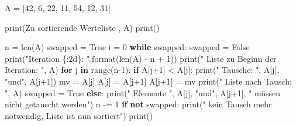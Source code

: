 \documentclass[
  letterpaper,
  DIV=11,
  numbers=noendperiod]{scrreprt}
\newenvironment{Shaded}{\begin{snugshade}}{\end{snugshade}}
\newcommand{\BuiltInTok}[1]{\textcolor[rgb]{0.00,0.23,0.31}{#1}}
\newcommand{\ControlFlowTok}[1]{\textcolor[rgb]{0.00,0.23,0.31}{\textbf{#1}}}
\newcommand{\DecValTok}[1]{\textcolor[rgb]{0.68,0.00,0.00}{#1}}
\newcommand{\KeywordTok}[1]{\textcolor[rgb]{0.00,0.23,0.31}{\textbf{#1}}}
\newcommand{\NormalTok}[1]{\textcolor[rgb]{0.00,0.23,0.31}{#1}}
\newcommand{\OperatorTok}[1]{\textcolor[rgb]{0.37,0.37,0.37}{#1}}
\newcommand{\SpecialCharTok}[1]{\textcolor[rgb]{0.37,0.37,0.37}{#1}}
\newcommand{\StringTok}[1]{\textcolor[rgb]{0.13,0.47,0.30}{#1}}
\newcommand{\VariableTok}[1]{\textcolor[rgb]{0.07,0.07,0.07}{#1}}
\begin{document}
\begin{Shaded}
\begin{Highlighting}[]
\NormalTok{A }\OperatorTok{=}\NormalTok{ [}\DecValTok{42}\NormalTok{, }\DecValTok{6}\NormalTok{, }\DecValTok{22}\NormalTok{, }\DecValTok{11}\NormalTok{, }\DecValTok{54}\NormalTok{, }\DecValTok{12}\NormalTok{, }\DecValTok{31}\NormalTok{]}

\BuiltInTok{print}\NormalTok{(}\StringTok{\textquotesingle{}Zu sortierende Werteliste \textquotesingle{}}\NormalTok{, A)}
\BuiltInTok{print}\NormalTok{()}

\NormalTok{n }\OperatorTok{=} \BuiltInTok{len}\NormalTok{(A)}
\NormalTok{swapped }\OperatorTok{=} \VariableTok{True}
\NormalTok{i }\OperatorTok{=} \DecValTok{0}
\ControlFlowTok{while}\NormalTok{ swapped:}
\NormalTok{    swapped }\OperatorTok{=} \VariableTok{False}
    \BuiltInTok{print}\NormalTok{(}\StringTok{"Iteration }\SpecialCharTok{\{:2d\}}\StringTok{: "}\NormalTok{.}\BuiltInTok{format}\NormalTok{(}\BuiltInTok{len}\NormalTok{(A) }\OperatorTok{{-}}\NormalTok{ n }\OperatorTok{+} \DecValTok{1}\NormalTok{))}
    \BuiltInTok{print}\NormalTok{(}\StringTok{"   Liste zu Beginn der Iteration: "}\NormalTok{, A)}
    \ControlFlowTok{for}\NormalTok{ j }\KeywordTok{in} \BuiltInTok{range}\NormalTok{(n}\OperatorTok{{-}}\DecValTok{1}\NormalTok{):}
        \ControlFlowTok{if}\NormalTok{ A[j}\OperatorTok{+}\DecValTok{1}\NormalTok{] }\OperatorTok{\textless{}}\NormalTok{ A[j]:}
            \BuiltInTok{print}\NormalTok{(}\StringTok{"   Tausche: "}\NormalTok{, A[j], }\StringTok{"und"}\NormalTok{, A[j}\OperatorTok{+}\DecValTok{1}\NormalTok{])}
\NormalTok{            mv }\OperatorTok{=}\NormalTok{ A[j]}
\NormalTok{            A[j] }\OperatorTok{=}\NormalTok{ A[j}\OperatorTok{+}\DecValTok{1}\NormalTok{]}
\NormalTok{            A[j}\OperatorTok{+}\DecValTok{1}\NormalTok{] }\OperatorTok{=}\NormalTok{ mv}
            \BuiltInTok{print}\NormalTok{(}\StringTok{"   Liste nach Tausch: "}\NormalTok{, A)}
\NormalTok{            swapped }\OperatorTok{=} \VariableTok{True}
        \ControlFlowTok{else}\NormalTok{:}
            \BuiltInTok{print}\NormalTok{(}\StringTok{"   Elemente "}\NormalTok{, A[j], }\StringTok{"und"}\NormalTok{, A[j}\OperatorTok{+}\DecValTok{1}\NormalTok{], }\StringTok{" müssen nicht getauscht werden"}\NormalTok{)}
\NormalTok{    n }\OperatorTok{{-}=} \DecValTok{1}
    \ControlFlowTok{if} \KeywordTok{not}\NormalTok{ swapped:}
        \BuiltInTok{print}\NormalTok{(}\StringTok{"   kein Tausch mehr notwendig, Liste ist nun sortiert"}\NormalTok{)}
    \BuiltInTok{print}\NormalTok{()}
\end{Highlighting}
\end{Shaded}
\end{document}
